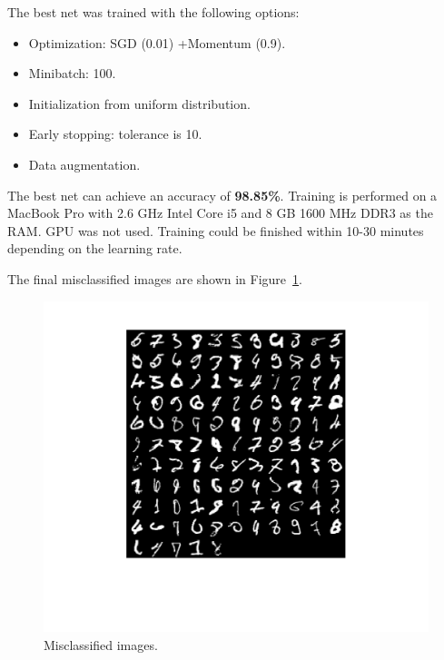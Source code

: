 \documentclass[a4paper]{article}
\begin{document}
The best net was trained with the following options:
\begin{itemize}
	\item  Optimization: SGD (0.01) +Momentum (0.9).
	\item Minibatch: 100.
	\item Initialization from uniform distribution.
	\item Early stopping: tolerance is 10.
	\item Data augmentation.
\end{itemize}
The best net can achieve an accuracy of \textbf{98.85\%}. Training is performed on a MacBook Pro with 2.6 GHz Intel Core i5 and 8 GB 1600 MHz DDR3 as the RAM. GPU was not used. Training could be finished within 10-30 minutes depending on the learning rate.

The final misclassified images are shown in Figure~\ref{figknn4}.
	\begin{figure}[ht]
	\centering
	\includegraphics[width=1\textwidth]{figures/mnist1.png}
	\caption{Misclassified images.}
	\label{figknn4}
\end{figure}



	
	
	
\end{document}
